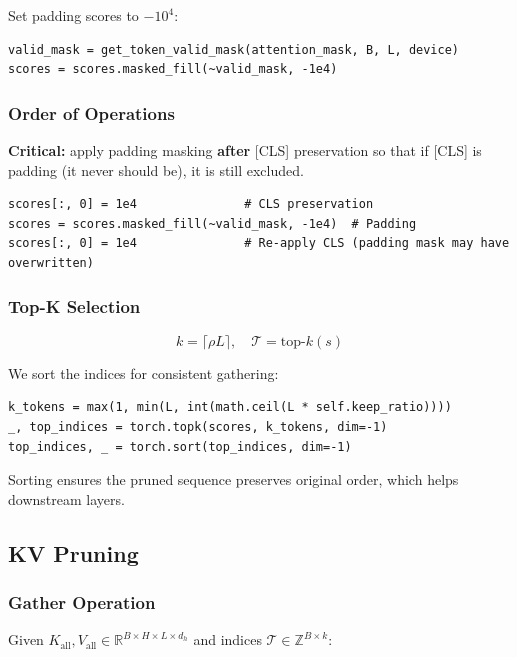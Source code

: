 Set padding scores to $-10^4$:

\begin{lstlisting}
valid_mask = get_token_valid_mask(attention_mask, B, L, device)
scores = scores.masked_fill(~valid_mask, -1e4)
\end{lstlisting}

\subsubsection{Order of Operations}

\textbf{Critical:} apply padding masking \textbf{after} [CLS] preservation so that 
if [CLS] is padding (it never should be), it is still excluded.

\begin{lstlisting}
scores[:, 0] = 1e4               # CLS preservation
scores = scores.masked_fill(~valid_mask, -1e4)  # Padding
scores[:, 0] = 1e4               # Re-apply CLS (padding mask may have overwritten)
\end{lstlisting}

\subsubsection{Top-K Selection}

\[
k = \lceil \rho L \rceil, \quad
\mathcal{T} = \text{top-}k(s)
\tag{4.2}
\]

We sort the indices for consistent gathering:

\begin{lstlisting}
k_tokens = max(1, min(L, int(math.ceil(L * self.keep_ratio))))
_, top_indices = torch.topk(scores, k_tokens, dim=-1)
top_indices, _ = torch.sort(top_indices, dim=-1)
\end{lstlisting}

Sorting ensures the pruned sequence preserves original order, which helps 
downstream layers.

\subsection{KV Pruning}

\subsubsection{Gather Operation}

Given $K_\text{all}, V_\text{all} \in \mathbb{R}^{B \times H \times L \times d_h}$ 
and indices $\mathcal{T} \in \mathbb{Z}^{B \times k}$:

